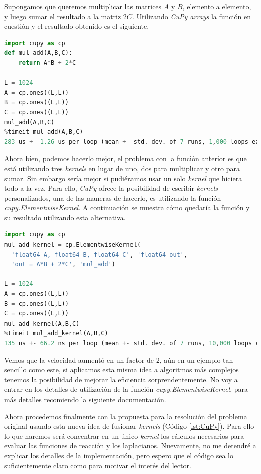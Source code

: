 Supongamos que queremos multiplicar las matrices $A$ y $B$, elemento a elemento, y luego sumar el resultado a la matriz $2C$. Utilizando 
\textit{CuPy arrays} la función en cuestión y el resultado obtenido es el siguiente.

\begin{lstlisting}[language=Python,label = {lst:sum_add}]
import cupy as cp
def mul_add(A,B,C):
    return A*B + 2*C

L = 1024
A = cp.ones((L,L))
B = cp.ones((L,L))
C = cp.ones((L,L))
mul_add(A,B,C)
%timeit mul_add(A,B,C)
283 us +- 1.26 us per loop (mean +- std. dev. of 7 runs, 1,000 loops each)
\end{lstlisting}

Ahora bien, podemos hacerlo mejor, el problema con la función anterior es que está utilizando tres \textit{kernels} en lugar de uno, dos para multiplicar 
y otro para sumar. Sin embargo sería mejor si pudiéramos usar un solo \textit{kernel} que hiciera todo a la vez. Para ello, \textit{CuPy} 
ofrece la posibilidad de escribir \textit{kernels} personalizados, una de las maneras de hacerlo, es utilizando la función \textit{cupy.ElementwiseKernel}.
A continuación se muestra cómo quedaría la función y su resultado utilizando esta alternativa.

\begin{lstlisting}[language=Python,label = {lst:sum_add_kernel}]
import cupy as cp
mul_add_kernel = cp.ElementwiseKernel(
  'float64 A, float64 B, float64 C', 'float64 out',
  'out = A*B + 2*C', 'mul_add')
  
L = 1024
A = cp.ones((L,L))
B = cp.ones((L,L))
C = cp.ones((L,L))
mul_add_kernel(A,B,C)
%timeit mul_add_kernel(A,B,C)
135 us +- 66.2 ns per loop (mean +- std. dev. of 7 runs, 10,000 loops each)
\end{lstlisting}
Vemos que la velocidad aumentó en un factor de 2, aún en un ejemplo tan sencillo como este, si aplicamos esta misma idea a algoritmos más 
complejos tenemos la posibilidad de mejorar la eficiencia sorprendentemente. No voy a entrar en los detalles de utilización de la función 
\textit{cupy.ElementwiseKernel}, para más detalles recomiendo la siguiente \href{https://docs.cupy.dev/en/stable/user_guide/kernel.html}{documentación}.

Ahora procedemos finalmente con la propuesta para la resolución del problema original usando esta nueva idea de fusionar \textit{kernels} 
(Código \ref{lst:CuPy}). Para ello lo que haremos será concentrar en un único \textit{kernel} los cálculos necesarios para evaluar las funciones 
de reacción y los laplacianos. Nuevamente, no me detendré a explicar los detalles de la implementación, pero espero que el código sea lo suficientemente
claro como para motivar el interés del lector.


